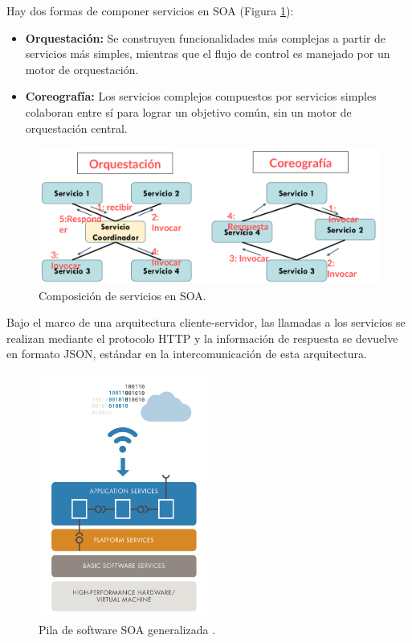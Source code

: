 Hay dos formas de componer servicios en SOA (Figura \ref{fig:soa_composition}):

\begin{itemize}
    \item \textbf{Orquestación:} Se construyen funcionalidades más complejas a partir de servicios más simples, mientras que el flujo de control es manejado por un motor de orquestación.
    \item \textbf{Coreografía:} Los servicios complejos compuestos por servicios simples colaboran entre sí para lograr un objetivo común, sin un motor de orquestación central.
\end{itemize}

\begin{figure}[H]
    \centering
    \includegraphics[width=1\textwidth]{./imagenes/Orquestacion_y_coreografia.png}
    \caption{Composición de servicios en SOA.}
    \label{fig:soa_composition}
\end{figure}

Bajo el marco de una arquitectura cliente-servidor, las llamadas a los servicios se realizan mediante el protocolo HTTP y la información de respuesta se devuelve en formato JSON, estándar en la intercomunicación de esta arquitectura.\newline

\begin{figure}
    \centering
    \includegraphics[width=0.5\textwidth]{./imagenes/SOA.png}
    \caption{Pila de software SOA generalizada \cite{soa}.}
    \label{fig:soa_stack}
\end{figure}

